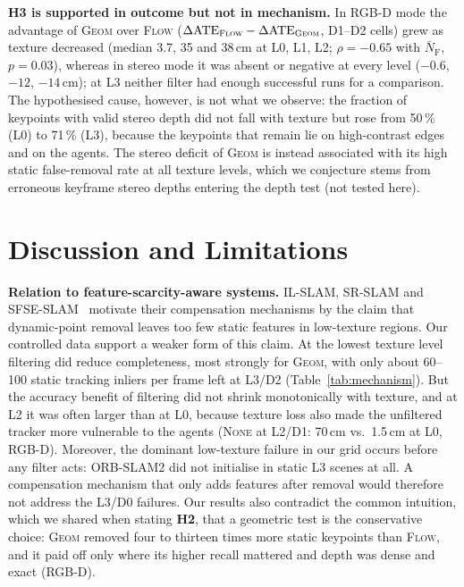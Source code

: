 \documentclass[conference]{IEEEtran}
\newcommand{\none}{\textsc{None}}
\newcommand{\flow}{\textsc{Flow}}
\newcommand{\geom}{\textsc{Geom}}
\newcommand{\hyp}[1]{\textbf{H#1}}
\newcommand{\NFAST}{\bar{N}_{\mathrm{F}}}
\begin{document}
\textbf{\hyp{3} is supported in outcome but not in mechanism.} In RGB-D mode the advantage of \geom{} over \flow{} ($\Delta\mathrm{ATE}_{\flow}-\Delta\mathrm{ATE}_{\geom}$, D1--D2 cells) grew as texture decreased (median 3.7, 35 and 38\,cm at L0, L1, L2; $\rho=-0.65$ with $\NFAST$, $p=0.03$), whereas in stereo mode it was absent or negative at every level ($-0.6$, $-12$, $-14$\,cm); at L3 neither filter had enough successful runs for a comparison. The hypothesised cause, however, is not what we observe: the fraction of keypoints with valid stereo depth did not fall with texture but rose from 50\,\% (L0) to 71\,\% (L3), because the keypoints that remain lie on high-contrast edges and on the agents. The stereo deficit of \geom{} is instead associated with its high static false-removal rate at all texture levels, which we conjecture stems from erroneous keyframe stereo depths entering the depth test (not tested here).

\section{Discussion and Limitations}
\label{sec:discussion}

\textbf{Relation to feature-scarcity-aware systems.} IL-SLAM, SR-SLAM and SFSE-SLAM~\cite{zhang2025ilslam,zhang2025srslam,li2026sfse} motivate their compensation mechanisms by the claim that dynamic-point removal leaves too few static features in low-texture regions. Our controlled data support a weaker form of this claim. At the lowest texture level filtering did reduce completeness, most strongly for \geom{}, with only about 60--100 static tracking inliers per frame left at L3/D2 (Table~\ref{tab:mechanism}). But the accuracy benefit of filtering did not shrink monotonically with texture, and at L2 it was often larger than at L0, because texture loss also made the unfiltered tracker more vulnerable to the agents (\none{} at L2/D1: 70\,cm vs.\ 1.5\,cm at L0, RGB-D). Moreover, the dominant low-texture failure in our grid occurs before any filter acts: ORB-SLAM2 did not initialise in static L3 scenes at all. A compensation mechanism that only adds features after removal would therefore not address the L3/D0 failures. Our results also contradict the common intuition, which we shared when stating \hyp{2}, that a geometric test is the conservative choice: \geom{} removed four to thirteen times more static keypoints than \flow{}, and it paid off only where its higher recall mattered and depth was dense and exact (RGB-D).
\end{document}

